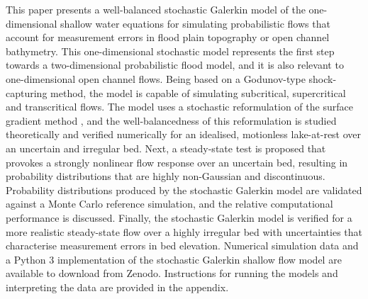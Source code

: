 This paper presents a well-balanced stochastic Galerkin model of the one-dimensional shallow water equations for simulating probabilistic flows that account for measurement errors in flood plain topography or open channel bathymetry.
This one-dimensional stochastic model represents the first step towards a two-dimensional probabilistic flood model, and it is also relevant to one-dimensional open channel flows.
Being based on a Godunov-type shock-capturing method, the model is capable of simulating subcritical, supercritical and transcritical flows.
The model uses a stochastic reformulation of the surface gradient method \citep{zhou2001}, and the well-balancedness of this reformulation is studied theoretically and verified numerically for an idealised, motionless lake-at-rest over an uncertain and irregular bed.
Next, a steady-state test is proposed that provokes a strongly nonlinear flow response over an uncertain bed, resulting in probability distributions that are highly non-Gaussian and discontinuous.
Probability distributions produced by the stochastic Galerkin model are validated against a Monte Carlo reference simulation, and the relative computational performance is discussed.
Finally, the stochastic Galerkin model is verified for a more realistic steady-state flow over a highly irregular bed with uncertainties that characterise measurement errors in bed elevation.
Numerical simulation data \citep{shaw-kesserwani2019a} and a Python 3 implementation of the stochastic Galerkin shallow flow model \citep{shaw-kesserwani2019b} are available to download from Zenodo.
Instructions for running the models and interpreting the data are provided in the appendix.

